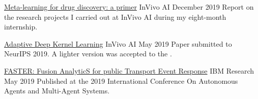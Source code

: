 





\begin{cvpublications}

    \cvpublication
    {\href{https://github.com/bdura/invivo-report/raw/report/InVivo AI Report.pdf}{Meta-learning for drug discovery: a primer} \acvHeaderIconSep\faLink} %
    {InVivo AI} %
    {December 2019} %
    {
      Report on the research projects I carried out at InVivo AI during my eight-month internship.
    }

    \cvpublication
    {\href{https://arxiv.org/pdf/1905.12131.pdf}{Adaptive Deep Kernel Learning} \acvHeaderIconSep\faLink} %
    {InVivo AI} %
    {May 2019} %
    {
      Paper submitted to NeurIPS 2019. A lighter version was accepted to the .
    }

    \cvpublication
    {\href{https://arxiv.org/pdf/1906.03040.pdf}{FASTER: Fusion AnalyticS for public Transport Event Response} \acvHeaderIconSep\faLink} %
    {IBM Research} %
    {May 2019} %
    {
      Published at the 2019 International Conference On Autonomous Agents and Multi-Agent Systems.
    }

\end{cvpublications}
